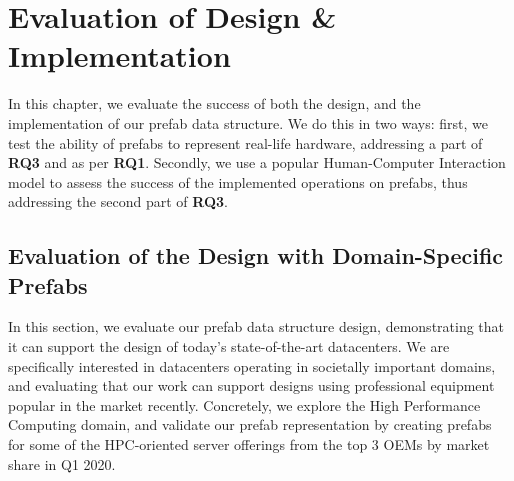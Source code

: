 \documentclass[11pt]{article}
\begin{document}
\section{Evaluation of Design \& Implementation} \label{sec:evaluation}
	In this chapter, we evaluate the success of both the design, and the implementation of our prefab data structure.
	We do this in two ways: first, we test the ability of prefabs to represent real-life hardware, addressing a part of \textbf{RQ3} and as per \textbf{RQ1}.
	Secondly, we use a popular Human-Computer Interaction model to assess the success of the implemented operations on prefabs, thus addressing the second part of \textbf{RQ3}.

	\subsection{Evaluation of the Design with Domain-Specific Prefabs} \label{sec:domainspecificprefabs}
		In this section, we evaluate our prefab data structure design, demonstrating that it can support the design of today's state-of-the-art datacenters. 
		We are specifically interested in datacenters operating in societally important domains, and evaluating that our work can support designs using professional equipment popular in the market recently. 
		Concretely, we explore the High Performance Computing domain, and validate our prefab representation by creating prefabs for some of the HPC-oriented server offerings from the top 3 OEMs by market share in Q1 2020.
	
\end{document}
